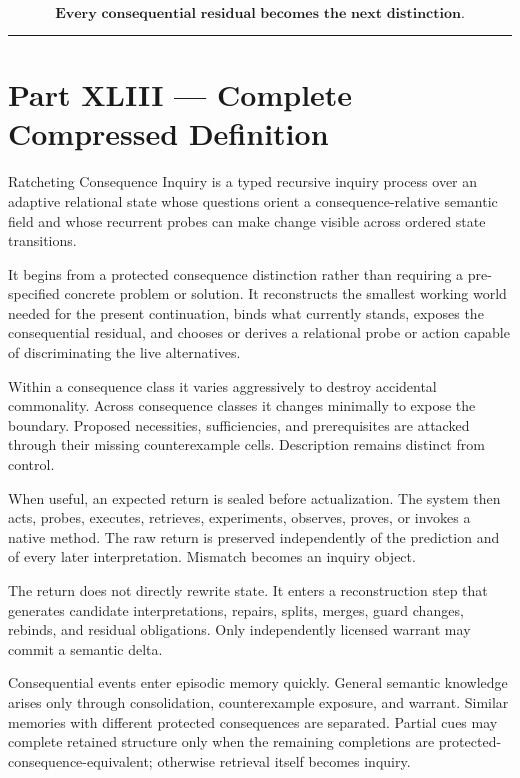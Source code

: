 \documentclass[
]{article}
\begin{document}
\[
\boxed{
\textbf{Every consequential residual becomes the next distinction.}
}
\]

\begin{center}\rule{0.5\linewidth}{0.5pt}\end{center}

\section{Part XLIII --- Complete Compressed
Definition}\label{part-xliii-complete-compressed-definition}

Ratcheting Consequence Inquiry is a typed recursive inquiry process over an
adaptive relational state whose questions orient a consequence-relative
semantic field and whose recurrent probes can make change visible across
ordered state transitions.

It begins from a protected consequence distinction rather than requiring a
pre-specified concrete problem or solution. It reconstructs the smallest
working world needed for the present continuation, binds what currently
stands, exposes the consequential residual, and chooses or derives a relational
probe or action capable of discriminating the live alternatives.

Within a consequence class it varies aggressively to destroy accidental
commonality. Across consequence classes it changes minimally to expose the
boundary. Proposed necessities, sufficiencies, and prerequisites are attacked
through their missing counterexample cells. Description remains distinct from
control.

When useful, an expected return is sealed before actualization. The system then
acts, probes, executes, retrieves, experiments, observes, proves, or invokes a
native method. The raw return is preserved independently of the prediction and
of every later interpretation. Mismatch becomes an inquiry object.

The return does not directly rewrite state. It enters a reconstruction step that
generates candidate interpretations, repairs, splits, merges, guard changes,
rebinds, and residual obligations. Only independently licensed warrant may
commit a semantic delta.

Consequential events enter episodic memory quickly. General semantic knowledge
arises only through consolidation, counterexample exposure, and warrant.
Similar memories with different protected consequences are separated. Partial
cues may complete retained structure only when the remaining completions are
protected-consequence-equivalent; otherwise retrieval itself becomes inquiry.
\end{document}

